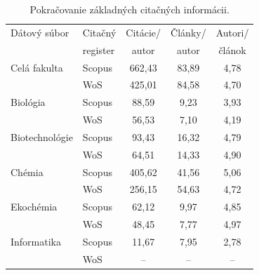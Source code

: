 \begin{table}
\centering\small
\begin{tabular}{llccc}
  \hline\noalign{\vspace{.3ex}}
  Dátový súbor & Citačný  & Citácie/ & Články/ & Autori/ \\
               & register & autor    & autor   & článok  \\[0.3ex]
  \hline\noalign{\vspace{.5ex}}
  Celá fakulta   & Scopus & 662,43 & 83,89 & 4,78 \\
                 & WoS    & 425,01 & 84,58 & 4,70 \\[1ex]
  Biológia       & Scopus &  88,59 &  9,23 & 3,93 \\
                 & WoS    &  56,53 &  7,10 & 4,19 \\[1ex]
  Biotechnológie & Scopus &  93,43 & 16,32 & 4,79 \\
                 & WoS    &  64,51 & 14,33 & 4,90 \\[1ex]
  Chémia         & Scopus & 405,62 & 41,56 & 5,06 \\
                 & WoS    & 256,15 & 54,63 & 4,72 \\[1ex]
  Ekochémia      & Scopus &  62,12 &  9,97 & 4,85 \\
                 & WoS    &  48,45 &  7,77 & 4,97 \\[1ex]
  Informatika    & Scopus &  11,67 &  7,95 & 2,78 \\
                 & WoS    &  --    & --    & --   \\[0.5ex]
  \hline
\end{tabular}
\caption{Pokračovanie základných citačných informácii.}
\label{tab:citation.info2}
\end{table}

